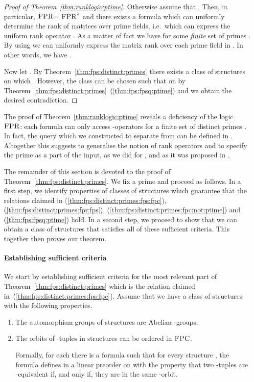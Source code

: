 \documentclass[a4paper,UKenglish]{lipics}
\newcommand{\logic}[1]{\ensuremath{\textsc{#1}}\xspace}
\newcommand{\FPC}{\logic{FPC}}
\newcommand{\FPRK}{\logic{FPR}}
\newcommand{\FPR}{\FPRK}
\newcommand{\FPRvar}{\ensuremath{\logic{FPR}^*}\xspace}
\theoremstyle{plain}
\begin{document}
\begin{proof}[Proof of Theorem~\ref{thm:ranklogic:ptime}]
 Otherwise assume that . 
Then, in particular, \FPR = \FPRvar and there exists a formula  which can uniformly determine the rank of matrices over prime fields, 
i.e.\ which can express the uniform rank operator .
As a matter of fact we have  for some \emph{finite} set 
of primes .
By using  we can uniformly express the matrix rank over each prime field 
 in . In other words, we have .

Now let . 
By Theorem~\ref{thm:fps:distinct:primes} there exists a class of 
structures  on which .
However, the class  can be chosen such that  on  by
Theorem~\ref{thm:fps:distinct:primes}~(\ref{thm:fps:fpsq:ptime})
and we obtain the desired contradiction.
\end{proof}

The proof of Theorem~\ref{thm:ranklogic:ptime} reveals a deficiency of the 
logic \FPR: each formula can only access -operators for a finite 
set  of distinct primes . In fact, the query which we constructed to 
separate  from  can be defined in . 
Altogether this suggests to generalise the notion of rank operators 
and to specify the prime  as a part of the input, as we did for , 
and as it was proposed in \cite{Ho10, La11, Pa10}. 


\medskip
The remainder of this section is devoted to the proof 
of Theorem~\ref{thm:fps:distinct:primes}.
We fix a prime  and proceed as follows.
In a first step, we identify properties of classes of 
structures  which guarantee that the relations claimed in
(\ref{thm:fps:distinct:primes:fps:fpc}),
(\ref{thm:fps:distinct:primes:fpr:fps}), 
(\ref{thm:fps:distinct:primes:fpc:not:ptime}) and
(\ref{thm:fps:fpsq:ptime}) hold.
In a second step, we proceed to show that we can obtain a
class of structures  that satisfies all of these sufficient 
criteria. This together then proves our theorem.

\paragraph*{Establishing sufficient criteria}
We start by establishing sufficient criteria for the most relevant 
part of Theorem~\ref{thm:fps:distinct:primes}
which is the relation claimed in~(\ref{thm:fps:distinct:primes:fps:fpc}).
Assume that we have a class of structures  with the following properties.
\begin{enumerate}[]
 \item \label{item:property:classk:autogroups}
 The automorphism groups  of 
structures  are Abelian -groups.
 \item \label{item:property:classk:deforbits}
 The orbits of -tuples in structures  can be ordered in 
\FPC.

Formally, for each  there is a formula 
 such that for 
every structure , the formula  defines in 
  a linear preorder  on  with the property that two 
-tuples  
are -equivalent if, and only if, they are in the same 
-orbit.
\end{enumerate}
\end{document}

